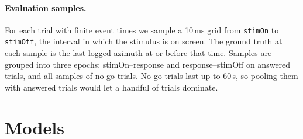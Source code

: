\documentclass[11pt,a4paper]{article}
\begin{document}
\paragraph{Evaluation samples.} For each trial with finite event times we sample a 10\,ms grid from
\texttt{stimOn} to \texttt{stimOff}, the interval in which the stimulus is on screen. The ground truth at each
sample is the last logged azimuth at or before that time. Samples are grouped into three epochs:
stimOn--response and response--stimOff on answered trials, and all samples of no-go trials. No-go trials last
up to 60\,s, so pooling them with answered trials would let a handful of trials dominate.

\section{Models}
\end{document}
